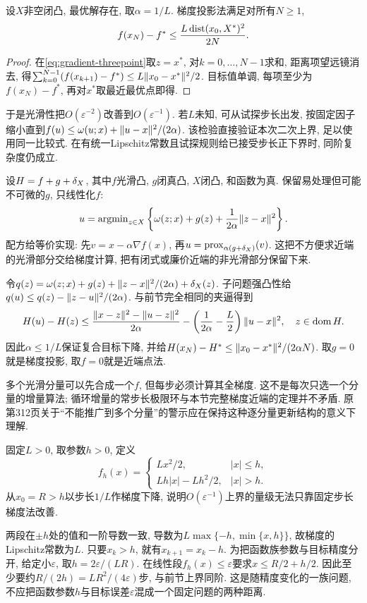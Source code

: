 \begin{theorem}\label{thm:gradient-complexity}
设$X$非空闭凸, 最优解存在, 取$\alpha=1/L$. 梯度投影法满足对所有$N\ge1$,
\[
 f(x_N)-f^*\le\frac{L\operatorname{dist}(x_0,X^*)^2}{2N}.
\]
\end{theorem}
\begin{proof}
在\eqref{eq:gradient-threepoint}取$z=x^*$, 对$k=0,\ldots,N-1$求和, 距离项望远镜消去, 得$\sum_{k=0}^{N-1}(f(x_{k+1})-f^*)\le L\lVert x_0-x^*\rVert^2/2$. 目标值单调, 每项至少为$f(x_N)-f^*$, 再对$x^*$取最近最优点即得.
\end{proof}

于是光滑性把$O(\varepsilon^{-2})$改善到$O(\varepsilon^{-1})$. 若$L$未知, 可从试探步长出发, 按固定因子缩小直到$f(u)\le\omega(u;x)+\lVert u-x\rVert^2/(2\alpha)$. 该检验直接验证本次二次上界, 足以使用同一比较式. 在有统一Lipschitz常数且试探规则给已接受步长正下界时, 同阶复杂度仍成立.

设$H=f+g+\delta_{X}$, 其中$f$光滑凸, $g$闭真凸, $X$闭凸, 和函数为真. 保留易处理但可能不可微的$g$, 只线性化$f$:
\begin{equation}\label{eq:forward-backward}
 u=\operatorname{argmin}_{z\in X}\left\{\omega(z;x)+g(z)+\frac1{2\alpha}\lVert z-x\rVert^2\right\}.
\end{equation}
配方给等价实现: 先$v=x-\alpha\nabla f(x)$, 再$u=\operatorname{prox}_{\alpha(g+\delta_{X})}(v)$. 这把不方便求近端的光滑部分交给梯度计算, 把有闭式或廉价近端的非光滑部分保留下来.

令$q(z)=\omega(z;x)+g(z)+\lVert z-x\rVert^2/(2\alpha)+\delta_{X}(z)$. 子问题强凸性给$q(u)\le q(z)-\lVert z-u\rVert^2/(2\alpha)$. 与前节完全相同的夹逼得到
\begin{equation}\label{eq:composite-threepoint}
 H(u)-H(z)\le\frac{\lVert x-z\rVert^2-\lVert u-z\rVert^2}{2\alpha}
 -\left(\frac1{2\alpha}-\frac L2\right)\lVert u-x\rVert^2,
 \quad z\in\operatorname{dom} H.
\end{equation}
因此$\alpha\le1/L$保证复合目标下降, 并给$H(x_N)-H^*\le\lVert x_0-x^*\rVert^2/(2\alpha N)$. 取$g=0$就是梯度投影, 取$f=0$就是近端点法.

多个光滑分量可以先合成一个$f$, 但每步必须计算其全梯度. 这不是每次只选一个分量的增量算法; 循环增量的常步长极限环与本节完整梯度近端的定理并不矛盾. 原第312页关于“不能推广到多个分量”的警示应在保持这种逐分量更新结构的意义下理解.

\begin{example}
固定$L>0$, 取参数$h>0$, 定义
\[
 f_h(x)=\begin{cases}
 Lx^2/2,&|x|\le h,\\
 Lh|x|-Lh^2/2,&|x|>h.
 \end{cases}
\]
从$x_0=R>h$以步长$1/L$作梯度下降, 说明$O(\varepsilon^{-1})$上界的量级无法只靠固定步长梯度法改善.
\end{example}
\begin{solution}
两段在$\pm h$处的值和一阶导数一致, 导数为$L\max\{-h,\min\{x,h\}\}$, 故梯度的Lipschitz常数为$L$. 只要$x_k>h$, 就有$x_{k+1}=x_k-h$. 为把函数族参数与目标精度分开, 给定小$\varepsilon$, 取$h=2\varepsilon/(LR)$. 在线性段$f_h(x)\le\varepsilon$要求$x\le R/2+h/2$. 因此至少要约$R/(2h)=LR^2/(4\varepsilon)$步, 与前节上界同阶. 这是随精度变化的一族问题, 不应把函数参数$h$与目标误差$\varepsilon$混成一个固定问题的两种距离.
\end{solution}

